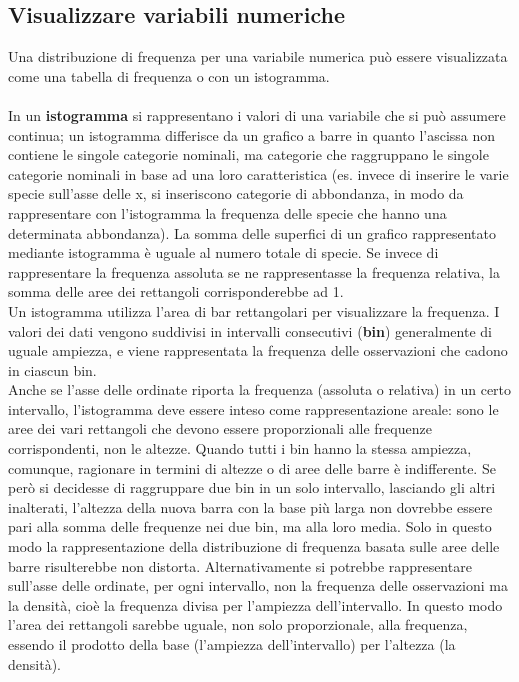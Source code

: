 \documentclass[drafts, 10pt]{book}
\begin{document}
\subsection{Visualizzare variabili numeriche}
Una distribuzione di frequenza per una variabile numerica può essere visualizzata come una tabella di frequenza o con un istogramma.
\\
\\
In un \textbf{istogramma} si rappresentano i valori di una variabile che si può assumere continua; un istogramma differisce da un grafico a barre in quanto l’ascissa non contiene le singole categorie nominali, ma categorie che raggruppano le singole categorie nominali in base ad una loro caratteristica (es. invece di inserire le varie specie sull’asse delle x, si inseriscono categorie di abbondanza, in modo da rappresentare con l’istogramma la frequenza delle specie che hanno una determinata abbondanza). 
La somma delle superfici di un grafico rappresentato mediante istogramma è uguale al numero totale di specie. Se invece di rappresentare la frequenza assoluta se ne rappresentasse la frequenza relativa, la somma delle aree dei rettangoli corrisponderebbe ad 1.
\\
Un istogramma utilizza l'area di bar rettangolari per visualizzare la frequenza. I valori dei dati vengono suddivisi in intervalli consecutivi (\textbf{bin}) generalmente di uguale ampiezza, e viene rappresentata la frequenza delle osservazioni che cadono in ciascun bin. 
\\
Anche se l'asse delle ordinate riporta la frequenza (assoluta o relativa) in un certo intervallo, l'istogramma deve essere inteso come rappresentazione areale: sono le aree dei vari rettangoli che devono essere proporzionali alle frequenze corrispondenti, non le altezze. Quando tutti i bin hanno la stessa ampiezza, comunque, ragionare in termini di altezze o di aree delle barre è indifferente. Se però si decidesse di raggruppare due bin in un solo intervallo, lasciando gli altri inalterati, l'altezza della nuova barra con la base più larga non dovrebbe essere pari alla somma delle frequenze nei due bin, ma alla loro media. Solo in questo modo la rappresentazione della distribuzione di frequenza basata sulle aree delle barre risulterebbe non distorta. Alternativamente si potrebbe rappresentare sull'asse delle ordinate, per ogni intervallo, non la frequenza delle osservazioni ma la densità, cioè la frequenza divisa per l'ampiezza dell'intervallo. In questo modo l'area dei rettangoli sarebbe uguale, non solo proporzionale, alla frequenza, essendo il prodotto della base (l'ampiezza dell'intervallo) per l'altezza (la densità).
\end{document}
